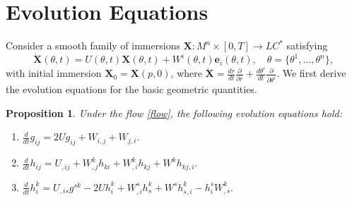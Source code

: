 \documentclass[reqno,11pt, letterpaper]{amsart}
\theoremstyle{plain}
\newtheorem{prop}[thm]{Proposition}
\theoremstyle{definition}
\numberwithin{equation}{section}
\begin{document}
\section{Evolution Equations}\label{sec-evo}
Consider a smooth family of immersions $\mathbf{X}: M^n \times [0,T] \to LC^*$
satisfying
\begin{equation}\label{flow}
	\dot{\mathbf{X}}(\theta,t) = U(\theta,t) \mathbf{X}(\theta,t) + W^i(\theta,t) \mathbf{e}_i(\theta,t), \quad \theta = \{\theta^1, \dots, \theta^n\},
\end{equation}
with initial immersion $\mathbf{X}_0 = \mathbf{X}(p,0)$, where $\displaystyle\dot{\mathbf{X}} = \frac{dr}{dt} \frac{\partial}{\partial r} + \frac{d\theta^i}{dt} \frac{\partial}{\partial \theta^i}.$
We first derive the evolution equations for the basic geometric quantities.
\begin{prop}
	Under the flow \eqref{flow}, the following evolution equations hold:
	\begin{enumerate}[leftmargin=20pt]
		\item [\textnormal{(1)}] \quad$\displaystyle\frac{d}{dt} g_{ij} = 2 U g_{ij} + W_{i,j} + W_{j,i}.$
		\item [\textnormal{(2)}] \quad$\displaystyle\frac{d}{dt} h_{ij} = U_{,ij} + W^k_{,j} h_{ki} + W^k_{,i} h_{kj} + W^k h_{kj,i}.$
		\item [\textnormal{(3)}] \quad$\displaystyle\frac{d}{dt} h_i^k = U_{,is} g^{sk} - 2 U h_i^k + W^s_{,i} h_s^k + W^s h_{s,i}^k - h_i^s W^k_{,s}.$
	\end{enumerate}
\end{prop}
\end{document}
